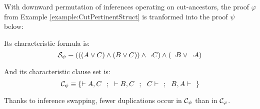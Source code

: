 \documentclass{llncs}
\begin{document}
\begin{example}
\label{example:InferencePermutation}
With downward permutation of inferences operating on cut-ancestors, the proof $\varphi$ from Example \ref{example:CutPertinentStruct} is tranformed into the proof $\psi$ below:
\begin{tiny}
\begin{prooftree}
 
 
		   		
				 
				 
						   		
			  		
						 
							 
						 
						  
\end{prooftree}
\end{tiny}

\noindent
Its characteristic formula is:
$$
\cutpertstruct{\psi} 
\equiv 
(((A\structtimes C) \structplus (B\structtimes C)) \structplus \structdual{C}) \structplus (\structdual{B} \structtimes \structdual{A})
$$

\noindent
And its characteristic clause set is: 
$$
\clauseset{\psi} \equiv \{ \seq A,C \ \ ; \ \ \seq B,C \ \ ; \ \ C \seq \ \ ; \ \ B, A \seq \ \  \}
$$

\noindent 
Thanks to inference swapping, fewer duplications occur in $\clauseset{\psi}$ than in $\clauseset{\varphi}$.
\hfill\QED
\end{example}
\end{document}
